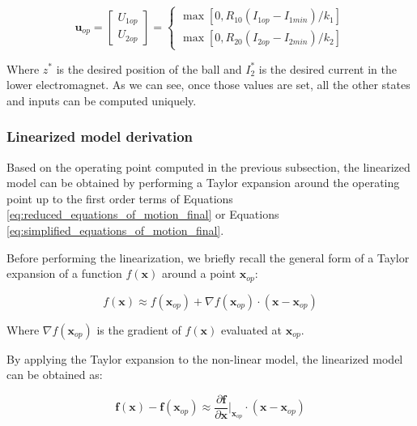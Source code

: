\begin{equation}
    \mathbf{u}_{op} =
    \begin{bmatrix}
        U_{1op} \\
        U_{2op}
    \end{bmatrix}
    =
    \begin{cases}
        \max{\left[0, R_{10} \left( I_{1op} - I_{1min} \right) / k_1 \right]} \\
        \max{\left[0, R_{20} \left( I_{2op} - I_{2min} \right) / k_2 \right]}
    \end{cases}
    \label{eq:operating_point_inputs}
\end{equation}

Where $z^*$ is the desired position of the ball and $I_{2}^*$ is the desired current in the lower electromagnet.
As we can see, once those values are set, all the other states and inputs can be computed uniquely.



\subsubsection{Linearized model derivation}
\label{subsubsec:linearized_model_derivation}

Based on the operating point computed in the previous subsection, the linearized model can be obtained by performing a Taylor expansion around the operating point up to the first order terms of Equations \ref{eq:reduced_equations_of_motion_final} or Equations \ref{eq:simplified_equations_of_motion_final}.

Before performing the linearization, we briefly recall the general form of a Taylor expansion of a function $f(\mathbf{x})$ around a point $\mathbf{x}_{op}$:

\begin{equation}
    f(\mathbf{x}) \approx f(\mathbf{x}_{op}) + \nabla f(\mathbf{x}_{op}) \cdot (\mathbf{x} - \mathbf{x}_{op})
\end{equation}

Where $\nabla f(\mathbf{x}_{op})$ is the gradient of $f(\mathbf{x})$ evaluated at $\mathbf{x}_{op}$.

By applying the Taylor expansion to the non-linear model, the linearized model can be obtained as:

\begin{equation}
    \mathbf{f}(\mathbf{x}) - \mathbf{f}(\mathbf{x}_{op})\approx \frac{\partial \mathbf{f}}{\partial \mathbf{x}} \Bigg|_{\mathbf{x}_{op}} \cdot (\mathbf{x} - \mathbf{x}_{op})
\end{equation}

